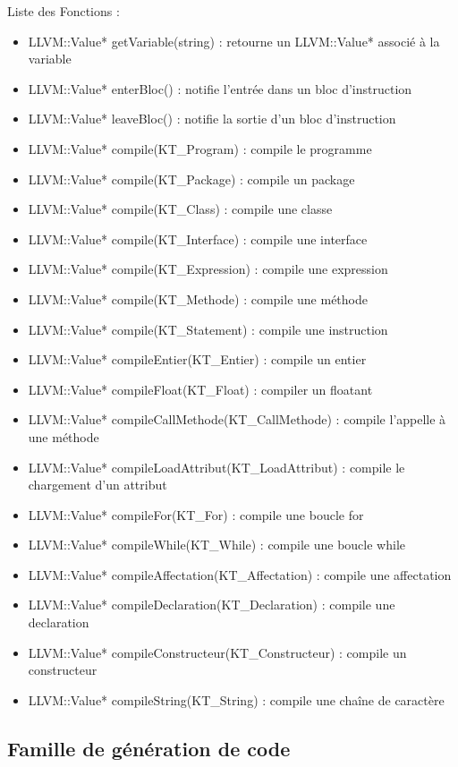 \documentclass{article}
\begin{document}
Liste des Fonctions :
\begin{itemize}
 \item LLVM::Value* getVariable(string) : retourne un LLVM::Value* associé à la variable
 \item LLVM::Value* enterBloc() : notifie l'entrée dans un bloc d'instruction
 \item LLVM::Value* leaveBloc() : notifie la sortie d'un bloc d'instruction
 \item LLVM::Value* compile(KT\_Program) : compile le programme 
 \item LLVM::Value* compile(KT\_Package) : compile un package  
 \item LLVM::Value* compile(KT\_Class) : compile une classe
 \item LLVM::Value* compile(KT\_Interface) : compile une interface
 \item LLVM::Value* compile(KT\_Expression) : compile une expression
 \item LLVM::Value* compile(KT\_Methode) : compile une méthode
 \item LLVM::Value* compile(KT\_Statement) : compile une instruction
 \item LLVM::Value* compileEntier(KT\_Entier) : compile un entier
 \item LLVM::Value* compileFloat(KT\_Float) : compiler un floatant
 \item LLVM::Value* compileCallMethode(KT\_CallMethode) : compile l'appelle à une méthode
 \item LLVM::Value* compileLoadAttribut(KT\_LoadAttribut) : compile le chargement d'un attribut
 \item LLVM::Value* compileFor(KT\_For) : compile une boucle for
 \item LLVM::Value* compileWhile(KT\_While) : compile une boucle while
 \item LLVM::Value* compileAffectation(KT\_Affectation) : compile une affectation
 \item LLVM::Value* compileDeclaration(KT\_Declaration) : compile une declaration
 \item LLVM::Value* compileConstructeur(KT\_Constructeur) : compile un constructeur
 \item LLVM::Value* compileString(KT\_String) : compile une chaîne de caractère
\end{itemize}


\subsection{Famille de génération de code}
\end{document}

